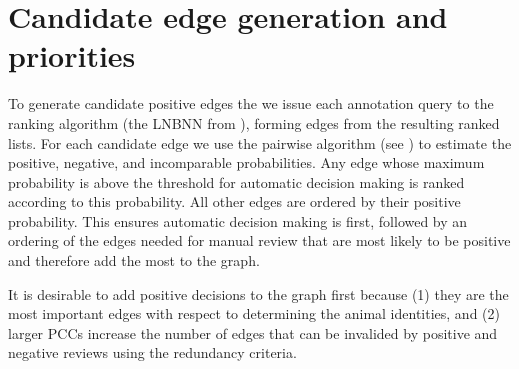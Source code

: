 


\section{Candidate edge generation and priorities}\label{sec:cand}

To generate candidate positive edges the we issue each annotation query to the ranking algorithm (the LNBNN from
), forming edges from the resulting ranked lists. For each candidate edge we use the pairwise
algorithm (see ) to estimate the positive, negative, and incomparable probabilities. Any edge
whose maximum probability is above the threshold for automatic decision making is ranked according to this
probability. All other edges are ordered by their positive probability. This ensures automatic decision making is
first, followed by an ordering of the edges needed for manual review that are most likely to be positive and
therefore add the most to the graph.

It is desirable to add positive decisions to the graph first because (1) they are the most important edges with
respect to determining the animal identities, and (2) larger PCCs increase the number of edges that can be
invalided by positive and negative reviews using the redundancy criteria.

